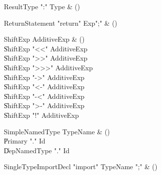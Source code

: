 \begin{bbgrammar}

ResultType \label{prod:ResultType}  \: \xcd":" Type & () \\


\end{bbgrammar}

\begin{bbgrammar}

ReturnStatement \label{prod:ReturnStatement}  \: \xcd"return" Exp\opt \xcd";" & () \\


\end{bbgrammar}

\begin{bbgrammar}

ShiftExp \label{prod:ShiftExp}  \: AdditiveExp & () \\

    \| ShiftExp \xcd"<<" AdditiveExp \\
    \| ShiftExp \xcd">>" AdditiveExp \\
    \| ShiftExp \xcd">>>" AdditiveExp \\
    \| ShiftExp  \xcd"->" AdditiveExp  \\
    \| ShiftExp  \xcd"<-" AdditiveExp  \\
    \| ShiftExp  \xcd"-<" AdditiveExp  \\
    \| ShiftExp  \xcd">-" AdditiveExp  \\
    \| ShiftExp  \xcd"!" AdditiveExp  \\

\end{bbgrammar}

\begin{bbgrammar}

SimpleNamedType \label{prod:SimpleNamedType}  \: TypeName & () \\

    \| Primary \xcd"." Id \\
    \| DepNamedType \xcd"." Id \\

\end{bbgrammar}

\begin{bbgrammar}

SingleTypeImportDecl \label{prod:SingleTypeImportDecl}  \: \xcd"import" TypeName \xcd";" & () \\


\end{bbgrammar}

